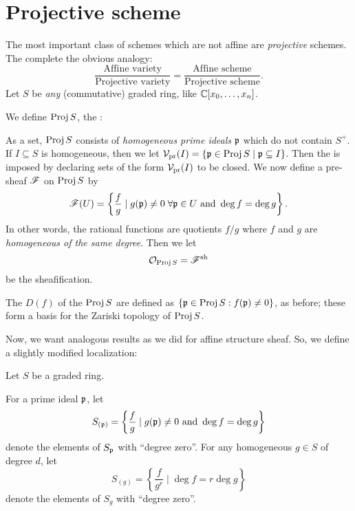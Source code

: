 \section{Projective scheme}
The most important class of schemes which are not affine are
\emph{projective} schemes.
The complete the obvious analogy:
\[
	\frac{\text{Affine variety}}{\text{Projective variety}}
	= 
	\frac{\text{Affine scheme}}{\text{Projective scheme}}.
\]
Let $S$ be \emph{any} (commutative) graded ring, like $\mathbb C[x_0, \dots, x_n]$.
\begin{definition}
	We define $\operatorname{Proj} S$, the :
	\begin{itemize}
		\ii As a set, $\operatorname{Proj} S$ consists of \emph{homogeneous prime ideals}
		$\mathfrak p$ which do not contain $S^+$.
		\ii If $I \subseteq S$ is homogeneous, then
		we let $\mathcal V_{\text{pr}}(I) = \{ \mathfrak p \in \operatorname{Proj} S \mid \mathfrak p \subseteq I \}$.
		Then the  is imposed by declaring 
		sets of the form $\mathcal V_{\text{pr}}(I)$ to be closed.
		\ii We now define a pre-sheaf $\mathscr F$ on $\operatorname{Proj} S$ by
		\[ \mathscr F(U) = 
			\left\{ \frac{f}{g} \mid 
			g(\mathfrak p) \neq 0 \; \forall \mathfrak p \in U \text{ and }
			\deg f = \deg g \right\}.
		\]
		In other words, the rational functions are quotients $f/g$
		where $f$ and $g$ are \emph{homogeneous of the same degree}.
		Then we let \[ \mathcal O_{\operatorname{Proj} S} = \mathscr F^\mathrm{sh} \] be the sheafification.
	\end{itemize}
\end{definition}
\begin{definition}
	The  $D(f)$ of the $\operatorname{Proj} S$
	are defined as $\left\{ \mathfrak p \in \operatorname{Proj} S : f(\mathfrak p) \neq 0 \right\}$,
	as before; these form a basis for the Zariski topology of $\operatorname{Proj} S$.
\end{definition}
Now, we want analogous results as we did for affine structure sheaf.
So, we define a slightly modified localization:
\begin{definition}
	Let $S$ be a graded ring.
	\begin{enumerate}[(i)]
		\ii For a prime ideal $\mathfrak p$, let
		\[ S_{(\mathfrak p)} = \left\{ \frac fg \mid g(\mathfrak p) \neq 0 \text{ and }
			\deg f = \deg g \right\} \]
		denote the elements of $S_\mathfrak p$ with ``degree zero''.
		\ii For any homogeneous $g \in S$ of degree $d$, let
		\[ S_{(g)} = \left\{ \frac{f}{g^r} \mid 
			\deg f = r \deg g \right\} \]
		denote the elements of $S_g$ with ``degree zero''.
	\end{enumerate}
\end{definition}

